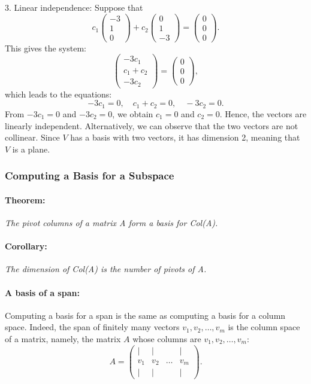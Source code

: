 \documentclass[a4paper,12pt]{article}
\begin{document}
3. Linear independence:
   Suppose that 
   \[
   c_1 \begin{pmatrix} -3 \\ 1 \\ 0 \end{pmatrix} + c_2 \begin{pmatrix} 0 \\ 1 \\ -3 \end{pmatrix} = \begin{pmatrix} 0 \\ 0 \\ 0 \end{pmatrix}.
   \]
   This gives the system:
   \[
   \begin{pmatrix} -3c_1 \\ c_1 + c_2 \\ -3c_2 \end{pmatrix} = \begin{pmatrix} 0 \\ 0 \\ 0 \end{pmatrix},
   \]
   which leads to the equations:
   \[
   -3c_1 = 0, \quad c_1 + c_2 = 0, \quad -3c_2 = 0.
   \]
   From \( -3c_1 = 0 \) and \( -3c_2 = 0 \), we obtain \( c_1 = 0 \) and \( c_2 = 0 \). Hence, the vectors are linearly independent.
Alternatively, we can observe that the two vectors are not collinear.
Since \( V \) has a basis with two vectors, it has dimension 2, meaning that \( V \) is a plane.

\subsubsection{Computing a Basis for a Subspace}
\paragraph{Theorem:}\textit{The pivot columns of a matrix A form a basis for Col(A).}
\paragraph{Corollary:}\textit{The dimension of Col(A) is the number of pivots of A.}
\paragraph{A basis of a span:}Computing a basis for a span is the same as computing a basis for a column space. Indeed, the span of finitely many vectors \( v_1, v_2, \dots, v_m \) is the column space of a matrix, namely, the matrix \( A \) whose columns are \( v_1, v_2, \dots, v_m \):
\[
A = \begin{pmatrix} | & | & & | \\ v_1 & v_2 & \dots & v_m \\ | & | & & | \end{pmatrix}.
\]
\end{document}
